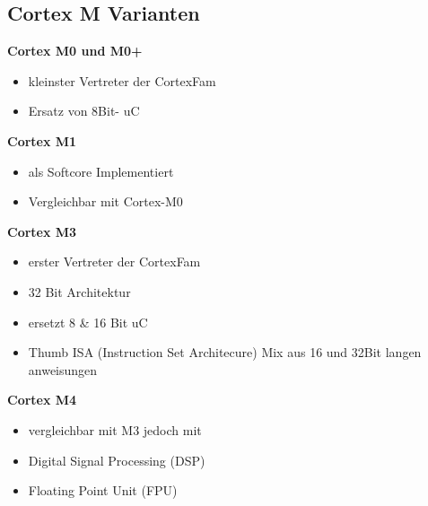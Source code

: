 \subsection{Cortex M Varianten}
\begin{multicols}{2}
\textbf{Cortex M0 und M0+}
    \begin{itemize}
        \item kleinster Vertreter der CortexFam
        \item Ersatz von 8Bit- uC
        \end{itemize}                     
 \textbf{Cortex M1}
    \begin{itemize}
        \item als Softcore Implementiert
        \item Vergleichbar mit Cortex-M0
    \end{itemize}
\end{multicols}
\begin{multicols}{2}
   \textbf{Cortex M3}     
     \begin{itemize}
         \item erster Vertreter der CortexFam
         \item 32 Bit Architektur
         \item ersetzt 8 \& 16 Bit uC
         \item Thumb ISA (Instruction Set Architecure)\newline
         Mix aus 16 und 32Bit langen anweisungen
     \end{itemize}   
               
   \textbf{Cortex M4} 
    \begin{itemize}
        \item vergleichbar mit M3 jedoch mit
        \qquad\item Digital Signal Processing (DSP)
        \qquad\item Floating Point Unit (FPU)
        \newline
      \end{itemize}  
\end{multicols}
